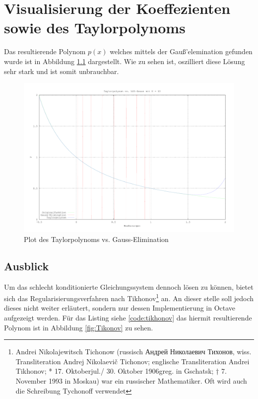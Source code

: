 \chapter{Visualisierung der Koeffezienten sowie des Taylorpolynoms}
Das resultierende Polynom \(p\left(x\right)\) welches mittels der Gauß'elemination gefunden wurde
ist in Abbildung \ref{fig:TaylorVsGauss} dargestellt. Wie zu sehen ist, oszilliert diese Lösung sehr
stark und ist somit unbrauchbar.

\begin{figure}[H]
    \vspace{-1em}
    \begin{center}
        \includegraphics[width=\textwidth]{img/aufgabe5.pdf}
    \end{center}
    \vspace{-1em}
    \caption{Plot des Taylorpolynoms vs. Gauss-Elimination}
    \label{fig:TaylorVsGauss}
\end{figure}

\section{Ausblick}
Um das schlecht konditionierte Gleichungssystem dennoch lösen zu können, bietet sich das
Regularisierungsverfahren nach Tikhonov\footnote{Andrei Nikolajewitsch Tichonow (russisch Андрей
Николаевич Тихонов, wiss. Transliteration Andrej Nikolaevič Tichonov; englische Transliteration
Andrei Tikhonov; * 17. Oktoberjul./ 30. Oktober 1906greg. in Gschatsk; † 7. November 1993 in Moskau)
war ein russischer Mathematiker. Oft wird auch die Schreibung Tychonoff verwendet} an. An dieser
stelle soll jedoch dieses nicht weiter erläutert, sondern nur dessen Implementierung in Octave
aufgezeigt werden. Für das Listing siehe \ref{code:tikhonov} das hiermit resultierende Polynom ist
in Abbildung \ref{fig:Tikonov} zu sehen.

